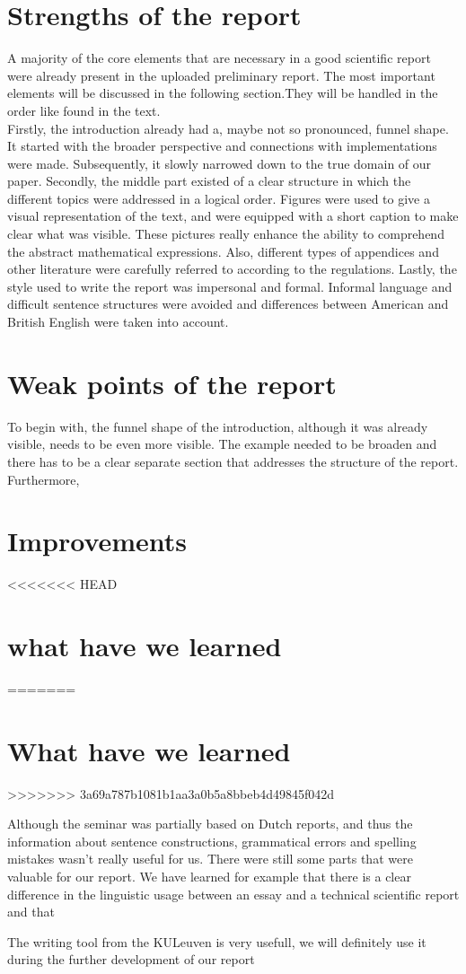\documentclass{article}
\begin{document}

\section{Strengths of the report}
A majority of the core elements that are necessary in a good scientific report were already present in the uploaded preliminary report. The most important elements will be discussed in the following section.They will be handled in the order like found in the text.\\
Firstly, the introduction already had a, maybe not so pronounced, funnel shape. It started with the broader perspective and connections with implementations were made. Subsequently, it slowly narrowed down to the true domain of our paper.
Secondly, the middle part existed of a clear structure in which the different topics were addressed in a logical order. Figures were used to give a visual representation of the text, and were equipped with a short caption to make clear what was visible. These pictures really enhance the ability to comprehend the abstract mathematical expressions. Also, different types of appendices and other literature were carefully referred to according to the regulations.
Lastly, the style used to write the report was impersonal and formal. Informal language and difficult sentence structures were avoided and differences between American and British English were taken into account. 

\section{Weak points of the report}

To begin with, the funnel shape of the introduction, although it was already visible, needs to be even more visible. The example needed to be broaden and there has to be a clear separate section that addresses the structure of the report.
\\
Furthermore, 

\section{Improvements}

<<<<<<< HEAD


\section{what have we learned}
=======
\section{What have we learned}
>>>>>>> 3a69a787b1081b1aa3a0b5a8bbeb4d49845f042d

Although the seminar was partially based on Dutch reports, and thus the information about sentence constructions, grammatical errors and spelling mistakes wasn't really useful for us. There were still some parts that were valuable for our report. We have learned for example 
that there is a clear difference in the linguistic usage between an essay and a technical scientific report and that 

The writing tool from the KULeuven is very usefull, we will definitely use it during the further development of our report
\end{document}
